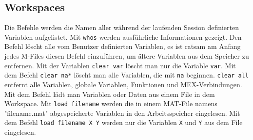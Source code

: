 \subsection{Workspaces}
Die Befehle  werden die Namen aller während der laufenden Session definierten Variablen aufgelistet. Mit {\color{red}\texttt{whos}} werden ausführliche Informationen gezeigt. 
\newline\newline
Den Befehl  löscht alle vom Benutzer definierten Variablen, es ist ratsam am Anfang jedes M-Files diesen Befehl einzuführen, um ältere Variablen aus dem Speicher zu entfernen. Mit der Variablen {\color{red}\texttt{clear var}} löscht man nur die Variable \texttt{var}. Mit dem Befehl {\color{red}\texttt{clear na*}} löscht man alle Variablen, die mit \texttt{na} beginnen. {\color{red}\texttt{clear all}} entfernt alle Variablen, globale Variablen, Funktionen und MEX-Verbindungen.
\newline\newline
Mit dem Befehl  lädt man Variablen oder Daten aus einem File in dem Workspace. Mit {\color{red}\texttt{load filename}} werden die in einem MAT-File namens "filename.mat" abgespeicherte Variablen in den Arbeitsspeicher eingelesen. Mit dem Befehl {\color{red}\texttt{load filename X Y}} werden nur die Variablen \texttt{X} und \texttt{Y} aus dem File eingelesen.
\newline\newline

